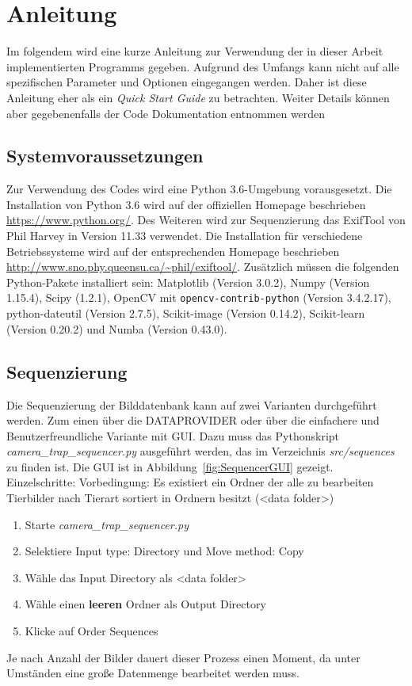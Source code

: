 \section*{Anleitung}
Im folgendem wird eine kurze Anleitung zur Verwendung der in dieser Arbeit implementierten Programms gegeben. Aufgrund des Umfangs kann nicht auf alle spezifischen Parameter und Optionen eingegangen werden. Daher ist diese Anleitung eher als ein \emph{Quick Start Guide} zu betrachten. Weiter Details können aber gegebenenfalls der Code Dokumentation entnommen werden
\subsection*{Systemvoraussetzungen}
Zur Verwendung des Codes wird eine Python 3.6-Umgebung vorausgesetzt. Die Installation von Python 3.6 wird auf der offiziellen Homepage beschrieben \url{https://www.python.org/}. Des Weiteren wird zur Sequenzierung das ExifTool von Phil Harvey in Version 11.33 verwendet. Die Installation für verschiedene Betriebssysteme wird auf der entsprechenden Homepage beschrieben \url{http://www.sno.phy.queensu.ca/~phil/exiftool/}. Zusätzlich müssen die folgenden Python-Pakete installiert sein: Matplotlib (Version 3.0.2), Numpy (Version 1.15.4), Scipy (1.2.1),  OpenCV mit \texttt{opencv-contrib-python} (Version 3.4.2.17), python-dateutil (Version 2.7.5), Scikit-image (Version 0.14.2), Scikit-learn (Version 0.20.2) und Numba (Version 0.43.0).
\subsection*{Sequenzierung}
Die Sequenzierung der Bilddatenbank kann auf zwei Varianten durchgeführt werden. Zum einen über die DATAPROVIDER oder über die einfachere und Benutzerfreundliche Variante mit GUI. Dazu muss das Pythonskript  \emph{camera\_trap\_sequencer.py} ausgeführt werden, das im Verzeichnis \emph{src/sequences} zu finden ist. Die GUI ist in Abbildung~\ref{fig:SequencerGUI} gezeigt.
Einzelschritte:
Vorbedingung: Es existiert ein Ordner der alle zu bearbeiten Tierbilder nach Tierart sortiert in Ordnern besitzt (<data folder>)
\begin{enumerate}
\item Starte \emph{camera\_trap\_sequencer.py}
\item Selektiere Input type: Directory und Move method: Copy
\item Wähle das Input Directory als <data folder>
\item Wähle einen \textbf{leeren} Ordner als Output Directory
\item Klicke auf Order Sequences
\end{enumerate}
Je nach Anzahl der Bilder dauert dieser Prozess einen Moment, da unter Umständen eine große Datenmenge bearbeitet werden muss.

